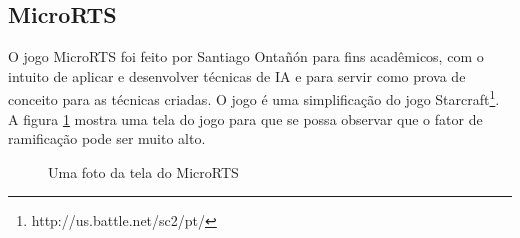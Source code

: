 \subsection{MicroRTS} 
O jogo MicroRTS foi feito por Santiago Ontañón \cite{ontanon2013combinatorial} para fins acadêmicos, com o intuito de aplicar e desenvolver técnicas de IA e para servir como prova de conceito para as técnicas criadas.  O jogo é uma simplificação do jogo Starcraft\footnote{http://us.battle.net/sc2/pt/}.
A figura \ref{fig:microrts} mostra uma tela do jogo para que se possa observar que o fator de ramificação pode ser muito alto.

\begin{figure}[ht]
	\centering
	\caption{Uma foto da tela do MicroRTS}
	\label{fig:microrts}
\end{figure} 
